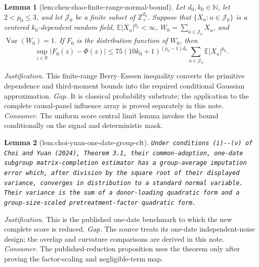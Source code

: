 \documentclass{article}
\newtheorem{lemma}{Lemma}
\begin{document}
\begin{lemma}[lem:chen-shao-finite-range-normal-bound]\label{lem:chen-shao-finite-range-normal-bound}
Let \(d_0,k_0\in\mathbb N\), let \(2<p_0\le 3\), and let \(\mathcal J_0\) be a finite subset of \(\mathbb Z_+^{d_0}\).  Suppose that \(\{X_u:u\in\mathcal J_0\}\) is a centered \(k_0\)-dependent random field, \(\mathbb E|X_u|^{p_0}<\infty\), \(W_0=\sum_{u\in\mathcal J_0}X_u\), and \(\operatorname{Var}(W_0)=1\).  If \(F_0\) is the distribution function of \(W_0\), then
\[
 \sup_{z\in\mathbb R}|F_0(z)-\Phi(z)|
 \le 75(10k_0+1)^{(p_0-1)d_0}
       \sum_{u\in\mathcal J_0}\mathbb E|X_u|^{p_0}.
\]
\end{lemma}
\par\smallskip\noindent \textit{Justification.} This finite-range Berry--Esseen inequality converts the primitive dependence and third-moment bounds into the required conditional Gaussian approximation. \textit{Gap.} It is classical probability substrate; the application to the complete causal-panel influence array is proved separately in this note. \textit{Consumer.} The uniform score central limit lemma invokes the bound conditionally on the signal and deterministic mask.

\begin{lemma}[lem:choi-yuan-one-date-group-clt]\label{lem:choi-yuan-one-date-group-clt}
\texttt{Under conditions (i)-\allowbreak{}-\allowbreak{}(v) of Choi and Yuan (2024),\allowbreak{} Theorem 3.1,\allowbreak{} their common-\allowbreak{}adoption,\allowbreak{} one-\allowbreak{}date subgroup matrix-\allowbreak{}completion estimator has a group-\allowbreak{}average imputation error which,\allowbreak{} after division by the square root of their displayed variance,\allowbreak{} converges in distribution to a standard normal variable.  Their variance is the sum of a donor-\allowbreak{}loading quadratic form and a group-\allowbreak{}size-\allowbreak{}scaled pretreatment-\allowbreak{}factor quadratic form.}
\end{lemma}
\par\smallskip\noindent \textit{Justification.} This is the published one-date benchmark to which the new complete score is reduced. \textit{Gap.} The source treats its one-date independent-noise design; the overlap and curvature comparisons are derived in this note. \textit{Consumer.} The published-reduction proposition uses the theorem only after proving the factor-scaling and negligible-term map.
\end{document}

